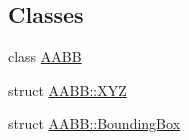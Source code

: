 \subsection*{Classes}
\begin{DoxyCompactItemize}
\item 
class \hyperlink{class_a_a_b_b}{A\+A\+BB}
\item 
struct \hyperlink{struct_a_a_b_b_1_1_x_y_z}{A\+A\+B\+B\+::\+X\+YZ}
\item 
struct \hyperlink{struct_a_a_b_b_1_1_bounding_box}{A\+A\+B\+B\+::\+Bounding\+Box}
\end{DoxyCompactItemize}
